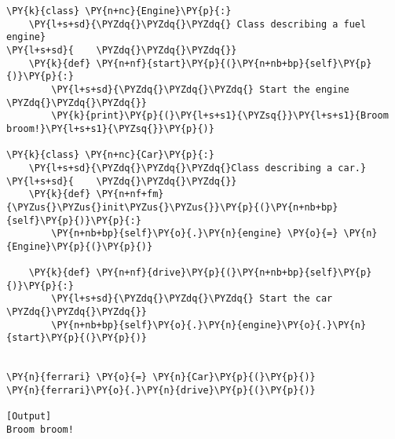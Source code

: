 \begin{Verbatim}[label=\makebox{\url{https://bitbucket.org/lbaldini/programming/src/tip/snippets/composition.py}},commandchars=\\\{\}]
\PY{k}{class} \PY{n+nc}{Engine}\PY{p}{:}
    \PY{l+s+sd}{\PYZdq{}\PYZdq{}\PYZdq{} Class describing a fuel engine}
\PY{l+s+sd}{    \PYZdq{}\PYZdq{}\PYZdq{}}
    \PY{k}{def} \PY{n+nf}{start}\PY{p}{(}\PY{n+nb+bp}{self}\PY{p}{)}\PY{p}{:}
        \PY{l+s+sd}{\PYZdq{}\PYZdq{}\PYZdq{} Start the engine \PYZdq{}\PYZdq{}\PYZdq{}}
        \PY{k}{print}\PY{p}{(}\PY{l+s+s1}{\PYZsq{}}\PY{l+s+s1}{Broom broom!}\PY{l+s+s1}{\PYZsq{}}\PY{p}{)}

\PY{k}{class} \PY{n+nc}{Car}\PY{p}{:}
    \PY{l+s+sd}{\PYZdq{}\PYZdq{}\PYZdq{}Class describing a car.}
\PY{l+s+sd}{    \PYZdq{}\PYZdq{}\PYZdq{}}
    \PY{k}{def} \PY{n+nf+fm}{\PYZus{}\PYZus{}init\PYZus{}\PYZus{}}\PY{p}{(}\PY{n+nb+bp}{self}\PY{p}{)}\PY{p}{:}
        \PY{n+nb+bp}{self}\PY{o}{.}\PY{n}{engine} \PY{o}{=} \PY{n}{Engine}\PY{p}{(}\PY{p}{)}
      
    \PY{k}{def} \PY{n+nf}{drive}\PY{p}{(}\PY{n+nb+bp}{self}\PY{p}{)}\PY{p}{:}
        \PY{l+s+sd}{\PYZdq{}\PYZdq{}\PYZdq{} Start the car \PYZdq{}\PYZdq{}\PYZdq{}}
        \PY{n+nb+bp}{self}\PY{o}{.}\PY{n}{engine}\PY{o}{.}\PY{n}{start}\PY{p}{(}\PY{p}{)}
    

\PY{n}{ferrari} \PY{o}{=} \PY{n}{Car}\PY{p}{(}\PY{p}{)}
\PY{n}{ferrari}\PY{o}{.}\PY{n}{drive}\PY{p}{(}\PY{p}{)}

[Output]
Broom broom!
\end{Verbatim}